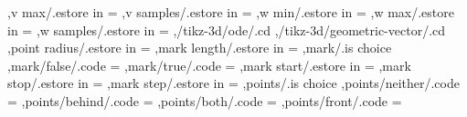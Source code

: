 {                ,v max/.estore in = \tikz@td@p@s@vmax
                ,v samples/.estore in = \tikz@td@p@s@vsamples
                ,w min/.estore in = \tikz@td@p@s@wmin
                ,w max/.estore in = \tikz@td@p@s@wmax
                ,w samples/.estore in = \tikz@td@p@s@wsamples
        ,/tikz-3d/ode/.cd %
        ,/tikz-3d/geometric-vector/.cd %
            ,point radius/.estore in = \tikz@td@gm@pointradius
            ,mark length/.estore in = \tikz@td@gm@marklength
            ,mark/.is choice 
                ,mark/false/.code = {\edef\tikz@td@gm@mark{0}}
                ,mark/true/.code = {\edef\tikz@td@gm@mark{1}}
            ,mark start/.estore in = \tikz@td@gm@markstart
            ,mark stop/.estore in = \tikz@td@gm@markstop
            ,mark step/.estore in = \tikz@td@gm@markstep
            ,points/.is choice 
                ,points/neither/.code = {\edef\tikz@td@gm@points{0}}
                ,points/behind/.code = {\edef\tikz@td@gm@points{1}}
                ,points/both/.code = {\edef\tikz@td@gm@points{2}}
                ,points/front/.code = {\edef\tikz@td@gm@points{3}}
}
